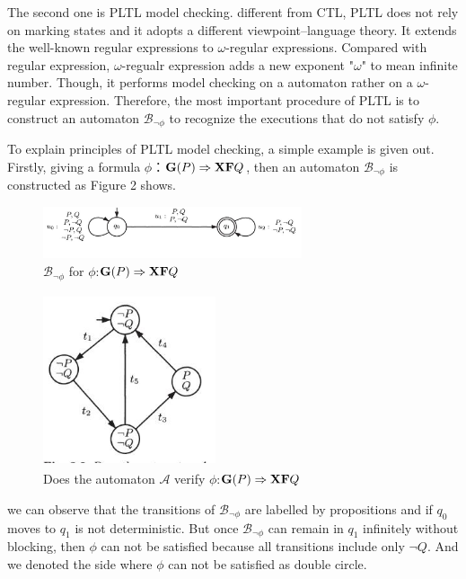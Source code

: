 \documentclass[11pt, conference]{IEEEtran}
\begin{document}
    The second one is PLTL model checking. different from CTL, PLTL does not rely on marking states and it adopts a different viewpoint--language theory. It extends the well-known regular expressions to $\omega$-regular expressions. Compared with regular expression, $\omega$-regualr expression adds a new exponent "$\omega$" to mean infinite number. Though, it performs model checking on a automaton rather on a $\omega$-regular expression. Therefore, the most important procedure of PLTL is to construct an automaton $\mathcal{B}_{\neg\phi}$ to recognize the executions that do not satisfy $\phi$. 
    
    To explain principles of PLTL model checking, a simple example is given out. Firstly, giving a formula $\phi$：$\text{\textbf{G}}(P)\Rightarrow\text{\textbf{X}}\text{\textbf{F}}Q$, then an automaton $\mathcal{B}_{\neg\phi}$ is constructed as Figure 2 shows.
\begin{figure}
  \centering
  \includegraphics[width=3.0in]{3_1.jpg}
  \caption{$\mathcal{B}_{\neg\phi}$ for $\phi$:$\text{\textbf{G}}(P)\Rightarrow\text{\textbf{X}}\text{\textbf{F}}Q$}
\end{figure}
\begin{figure}
  \centering
  \includegraphics[width=2.0in,height=2.0in]{3_2.jpg}
  \caption{Does the automaton $\mathcal{A}$ verify $\phi$:$\text{\textbf{G}}(P)\Rightarrow\text{\textbf{X}}\text{\textbf{F}}Q$}
\end{figure}
    we can observe that the transitions of $\mathcal{B}_{\neg\phi}$ are labelled by propositions and if $q_0$ moves to $q_1$ is not deterministic. But once $\mathcal{B}_{\neg\phi}$ can remain in $q_1$ infinitely without blocking, then $\phi$ can not be satisfied because all transitions include only $\neg Q$. And we denoted the side where $\phi$ can not be satisfied as double circle. 
    
\end{document}
